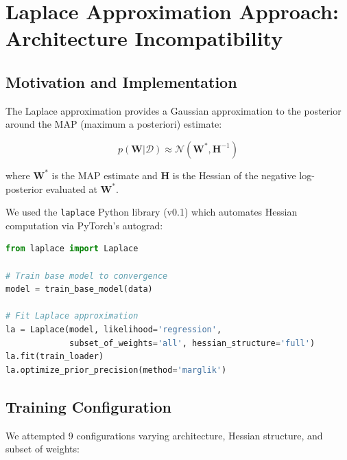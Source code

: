 \section{Laplace Approximation Approach: Architecture Incompatibility}

\subsection{Motivation and Implementation}

The Laplace approximation provides a Gaussian approximation to the posterior around the MAP (maximum a posteriori) estimate:

\begin{equation}
p(\mathbf{W} | \mathcal{D}) \approx \mathcal{N}(\mathbf{W}^*, \mathbf{H}^{-1})
\end{equation}

where $\mathbf{W}^*$ is the MAP estimate and $\mathbf{H}$ is the Hessian of the negative log-posterior evaluated at $\mathbf{W}^*$.

We used the \texttt{laplace} Python library (v0.1) which automates Hessian computation via PyTorch's autograd:

\begin{lstlisting}[language=Python]
from laplace import Laplace

# Train base model to convergence
model = train_base_model(data)

# Fit Laplace approximation
la = Laplace(model, likelihood='regression',
             subset_of_weights='all', hessian_structure='full')
la.fit(train_loader)
la.optimize_prior_precision(method='marglik')
\end{lstlisting}

\subsection{Training Configuration}

We attempted 9 configurations varying architecture, Hessian structure, and subset of weights:

